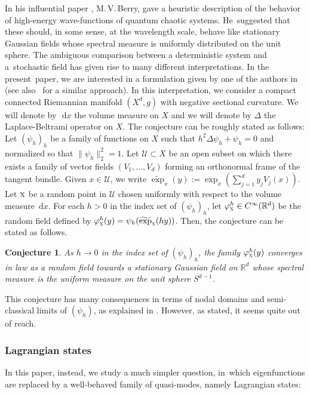 \documentclass[10pt]{amsart}
\let\mathcal\mathscr
\newcommand{\rd}{\,\mathrm{d}}
\theoremstyle{plain}
\newtheorem*{conjecture}{Conjecture}
\theoremstyle{definition}
\newcommand{\R}{\mathbb{R}}
\begin{document}
In his influential paper \cite{Ber}, M.\,V.\,Berry, gave a heuristic descrip\-tion of the behavior of high-energy wave-functions of quantum chaotic systems. He~suggested that these should, in some sense, at the wavelength scale, behave like stationary Gaussian fields whose spectral measure is uniformly distributed on the unit sphere. The ambiguous comparison between a deterministic system and a~stochastic field has given rise to many different interpretations. In the present~paper, we are interested in a formulation given by one of the authors in \cite{LWL} (see also~\cite{ABLM} for a similar approach). In this interpretation, we consider a compact connected Riemannian manifold $(X^d,g)$ with negative sectional curvature. We will denote by~$\rd x$ the volume measure on $X$ and we will denote by $\Delta$ the Laplace-Beltrami operator on $X$. The conjecture can be roughly stated as follows: Let $(\psi_h)_h$ be a family of functions on $X$ such that $h^2\Delta\psi_h+\psi_h=0$ and normalized so that $\|\psi_h\|_2^2=1$. Let $\mathcal{U}\subset X$ be an open subset on which there exists a family of vector fields $(V_1,\dots,V_d)$ forming an orthonormal frame of the tangent bundle. Given $x\in \mathcal{U}$, we write $\widetilde{\exp}_x(y):=\exp_x(\sum_{j=1}^d y_jV_j(x))$. Let $\textsc{x}$ be a random point in $\mathcal{U}$ chosen uniformly with respect to the volume measure $\rd x$. For each $h>0$ in the index set of $(\psi_h)_h$, let $\varphi_{\textsc{x}}^h\in C^\infty(\R^d)$ be the random field defined by $\varphi_{\textsc{x}}^h(y)=\psi_h(\widetilde{\exp}_{\textsc{x}}(hy))$. Then, the conjecture can be stated as follows.\enlargethispage{.5\baselineskip}%

\begin{conjecture}
As $h\to 0$ in the index set of $(\psi_h)_h$, the family $\varphi_{\textsc{x}}^h(y)$ converges in law as a random field towards a stationary Gaussian field on $\R^d$ whose spectral measure is the uniform measure on the unit sphere $S^{d-1}$.
\end{conjecture}

This conjecture has many consequences in terms of nodal domains and semi-classical limits of $(\psi_h)$, as explained in \cite{LWL}. However, as stated, it seems quite out of reach.

\subsubsection*{Lagrangian states}

In this paper, instead, we study a much simpler question, in~which eigenfunctions are replaced by a well-behaved family of quasi-modes, namely Lagrangian states:
\end{document}
